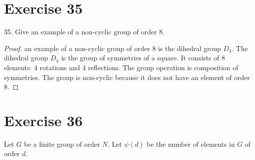\documentclass{article}
\begin{document}
\section*{Exercise 35}
35. Give an example of a non-cyclic group of order 8.
\begin{proof}
    an example of a non-cyclic group of order 8 is the dihedral group \( D_4 \). The dihedral group \( D_4 \) is the group of symmetries of a square. It consists of 8 elements: 4 rotations and 4 reflections. The group operation is composition of symmetries. The group is non-cyclic because it does not have an element of order 8.

\end{proof}

\section*{Exercise 36}
Let \( G \) be a finite group of order \( N \). Let \( \psi(d) \) be the number of elements in \( G \) of order \( d \).
\end{document}
